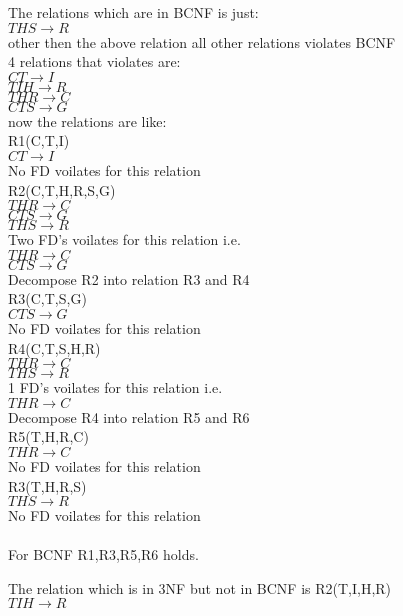 
The relations which are in BCNF is just:\\
$THS \rightarrow R$\\
other then the above relation all other relations violates BCNF\\

4 relations that violates are:\\
$CT \rightarrow I$\\
$TIH \rightarrow R$\\
$THR \rightarrow C$\\
$CTS \rightarrow G$\\

now the relations are like:\\
R1(C,T,I)\\
$CT \rightarrow I$\\ 
No FD voilates for this relation \\ 

R2(C,T,H,R,S,G)\\
$THR \rightarrow C$\\
$CTS \rightarrow G$\\
$THS \rightarrow R$\\ 
Two FD's voilates for this relation i.e. \\
$THR \rightarrow C$\\
$CTS \rightarrow G$\\
Decompose R2 into relation R3 and R4\\ 

R3(C,T,S,G)\\
$CTS \rightarrow G$\\ 
No FD voilates for this relation \\ 


R4(C,T,S,H,R)\\
$THR \rightarrow C$\\
$THS \rightarrow R$\\ 
1 FD's voilates for this relation i.e. \\
$THR \rightarrow C$\\
Decompose R4 into relation R5 and R6\\ 


R5(T,H,R,C)\\
$THR \rightarrow C$\\ 
No FD voilates for this relation \\ 

R3(T,H,R,S)\\
$THS \rightarrow R$\\ 
No FD voilates for this relation \\ \\

For BCNF R1,R3,R5,R6 holds.

The relation which is in 3NF but not in BCNF is 
R2(T,I,H,R)\\
$TIH \rightarrow R$\\ \\